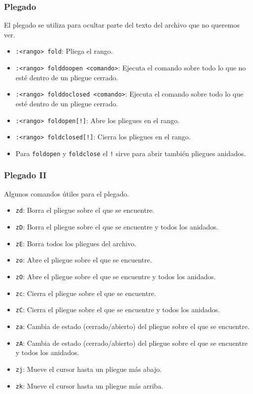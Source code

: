 \documentclass[10pt]{beamer}
\begin{document}
  \begin{frame}[containsverbatim]
    \frametitle{Plegado}
    El plegado se utiliza para ocultar parte del texto del archivo que no queremos ver. 
    \begin{itemize}
      \item \verb+:<rango> fold+: Pliega el rango.
      \item \verb+:<rango> folddoopen <comando>+: Ejecuta el comando sobre todo lo que no esté dentro de un pliegue cerrado.
      \item \verb+:<rango> folddoclosed <comando>+: Ejecuta el comando sobre todo lo que esté dentro de un pliegue cerrado.
      \item \verb+:<rango> foldopen[!]+: Abre los pliegues en el rango.
      \item \verb+:<rango> foldclosed[!]+: Cierra los pliegues en el rango.
      \item Para \verb+foldopen+ y \verb+foldclose+ el \verb+!+ sirve para abrir también pliegues anidados.
    \end{itemize}
  \end{frame}
  
  \begin{frame}[containsverbatim]
    \frametitle{Plegado II}
    Algunos comandos útiles para el plegado.
    \begin{itemize}
      \item \verb+zd+: Borra el pliegue sobre el que se encuentre.
      \item \verb+zD+: Borra el pliegue sobre el que se encuentre y todos los anidados.
      \item \verb+zE+: Borra todos los pliegues del archivo.
      \item \verb+zo+: Abre el pliegue sobre el que se encuentre.
      \item \verb+zO+: Abre el pliegue sobre el que se encuentre y todos los anidados.
      \item \verb+zc+: Cierra el pliegue sobre el que se encuentre.
      \item \verb+zC+: Cierra el pliegue sobre el que se encuentre y todos los anidados.
      \item \verb+za+: Cambia de estado (cerrado/abierto) del pliegue sobre el que se encuentre.
      \item \verb+zA+: Cambia de estado (cerrado/abierto) del pliegue sobre el que se encuentre y todos los anidados.
      \item \verb+zj+: Mueve el cursor hasta un pliegue más abajo.
      \item \verb+zk+: Mueve el cursor hasta un pliegue más arriba.
    \end{itemize}
  \end{frame}
  
\end{document}
